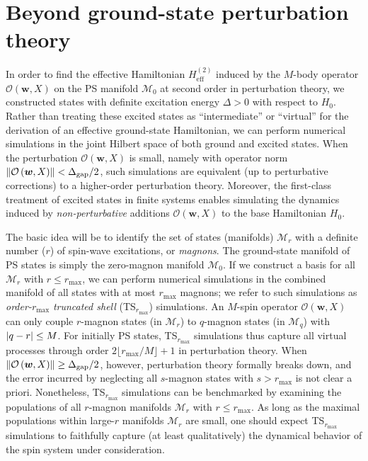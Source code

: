 \documentclass[nofootinbib,notitlepage,11pt]{revtex4-2}
\renewcommand{\t}{\text} %
\newcommand{\p}[1]{\left(#1\right)} %
\newcommand{\m}{\bm} %
\newcommand{\1}{\mathds{1}}
\newcommand{\M}{\mathcal{M}}
\renewcommand{\O}{\mathcal{O}}
\newcommand{\floor}[1]{\lfloor{#1}\rfloor}
\begin{document}
\section{Beyond ground-state perturbation theory}
\label{sec:shell_model}

In order to find the effective Hamiltonian $H_{\t{eff}}^{(2)}$ induced by the $M$-body operator $\O\p{\m w,X}$ on the PS manifold $\M_0$ at second order in perturbation theory, we constructed states with definite excitation energy $\Delta>0$ with respect to $H_0$.
Rather than treating these excited states as ``intermediate'' or ``virtual'' for the derivation of an effective ground-state Hamiltonian, we can perform numerical simulations in the joint Hilbert space of both ground and excited states.
When the perturbation $\O\p{\m w,X}$ is small, namely with operator norm $\norm{\O\p{\m w,X}}<\Delta_{\t{gap}}/2$, such simulations are equivalent (up to perturbative corrections) to a higher-order perturbation theory.
Moreover, the first-class treatment of excited states in finite systems enables simulating the dynamics induced by {\it non-perturbative} additions $\O\p{\m w,X}$ to the base Hamiltonian $H_0$.

The basic idea will be to identify the set of states (manifolds) $\M_r$ with a definite number ($r$) of spin-wave excitations, or {\it magnons}.
The ground-state manifold of PS states is simply the zero-magnon manifold $\M_0$.
If we construct a basis for all $\M_r$ with $r\le r_{\t{max}}$, we can perform numerical simulations in the combined manifold of all states with at most $r_{\t{max}}$ magnons; we refer to such simulations as {\it order-}$r_{\t{max}}$ {\it truncated shell} (TS$_{r_{\t{max}}}$) simulations.
An $M$-spin operator $\O\p{\m w,X}$ can only couple $r$-magnon states (in $\M_r$) to $q$-magnon states (in $\M_q$) with $\abs{q-r}\le M$.
For initially PS states, TS$_{r_{\t{max}}}$ simulations thus capture all virtual processes through order $2\floor{r_{\t{max}}/M}+1$ in perturbation theory.
When $\norm{\O\p{\m w,X}}\ge\Delta_{\t{gap}}/2$, however, perturbation theory formally breaks down, and the error incurred by neglecting all $s$-magnon states with $s>r_{\t{max}}$ is not clear a priori.
Nonetheless, TS$_{r_{\t{max}}}$ simulations can be benchmarked by examining the populations of all $r$-magnon manifolds $\M_r$ with $r\le r_{\t{max}}$.
As long as the maximal populations within large-$r$ manifolds $\M_r$ are small, one should expect TS$_{r_{\t{max}}}$ simulations to faithfully capture (at least qualitatively) the dynamical behavior of the spin system under consideration.
\end{document}
